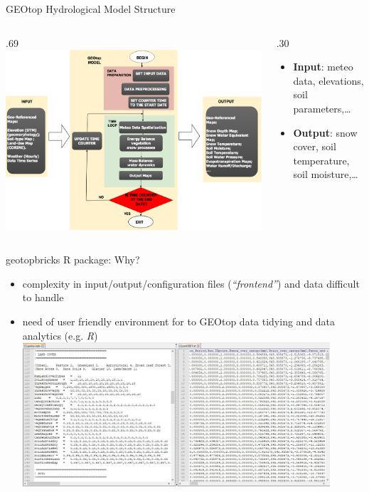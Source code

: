 \documentclass[ignorenonframetext,]{beamer}
\providecommand{\tightlist}{%
  \setlength{\itemsep}{0pt}\setlength{\parskip}{0pt}}
\def\begincols{\begin{columns}}
\def\begincol{\begin{column}}
\def\endcol{\end{column}}
\def\endcols{\end{columns}}
\begin{document}
\begin{frame}{GEOtop Hydrological Model Structure}

\begincols

\begincol{.69\textwidth}
\includegraphics[width=1.00000\textwidth]{resources/images/geotop_revised.png}\\
\endcol

\begincol{.30\textwidth}

\begin{itemize}
\item
  \textbf{Input}: meteo data, elevations, soil parameters,\ldots{}
\item
  \textbf{Output}: snow cover, soil temperature, soil moisture,\ldots{}
\end{itemize}

\endcol
\endcols

\end{frame}

\begin{frame}{geotopbricks R package: Why?}

\begin{itemize}
\tightlist
\item
  complexity in input/output/configuration files (\emph{``frontend''})
  and data difficult to handle
\item
  need of user friendly environment for to GEOtop data tidying and data
  analytics (e.g. \emph{R})
  \includegraphics[width=0.90000\textwidth]{resources/images/Capture_IO_GEOtopJPG.JPG}\\
\end{itemize}

\end{frame}
\end{document}
